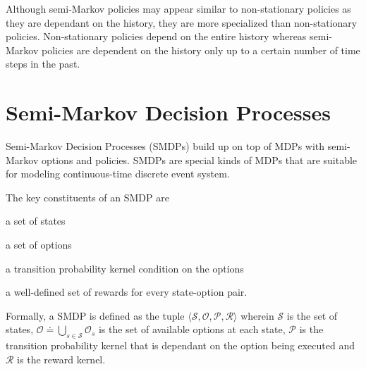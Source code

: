 Although semi-Markov policies may appear similar to non-stationary policies as they are dependant on the history, they are more specialized than non-stationary policies.
Non-stationary policies depend on the entire history whereas semi-Markov policies are dependent on the history only up to a certain number of time steps in the past.


\section{Semi-Markov Decision Processes}


Semi-Markov Decision Processes (SMDPs) build up on top of MDPs with semi-Markov options and policies.
SMDPs are special kinds of MDPs that are suitable for modeling continuous-time discrete event system.

The key constituents of an SMDP are
\begin{inparaenum}[(a)]
    \item a set of states
    \item a set of options
    \item a transition probability kernel condition on the options
    \item a well-defined set of rewards for every state-option pair.
\end{inparaenum}

Formally, a SMDP is defined as the tuple $\langle \mathcal{S}, \mathcal{O}, \mathcal{P}, \mathcal{R} \rangle$ wherein $\mathcal{S}$ is the set of states, $\mathcal{O} \doteq \bigcup_{s \in \mathcal{S}} \mathcal{O}_s$ is the set of available options at each state, $\mathcal{P}$ is the transition probability kernel that is dependant on the option being executed and $\mathcal{R}$ is the reward kernel.